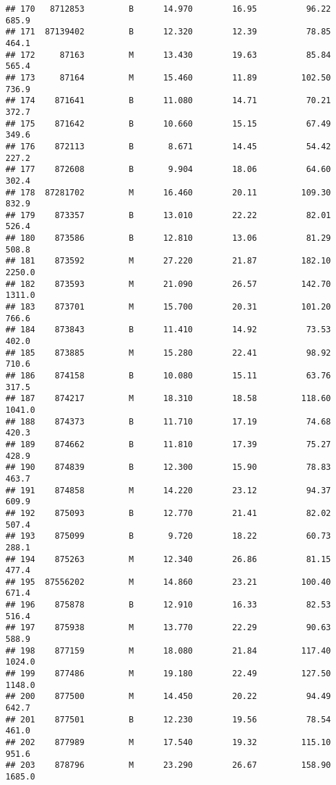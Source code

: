 \documentclass[
]{article}
\begin{document}
\begin{verbatim}
## 170   8712853         B      14.970        16.95          96.22     685.9
## 171  87139402         B      12.320        12.39          78.85     464.1
## 172     87163         M      13.430        19.63          85.84     565.4
## 173     87164         M      15.460        11.89         102.50     736.9
## 174    871641         B      11.080        14.71          70.21     372.7
## 175    871642         B      10.660        15.15          67.49     349.6
## 176    872113         B       8.671        14.45          54.42     227.2
## 177    872608         B       9.904        18.06          64.60     302.4
## 178  87281702         M      16.460        20.11         109.30     832.9
## 179    873357         B      13.010        22.22          82.01     526.4
## 180    873586         B      12.810        13.06          81.29     508.8
## 181    873592         M      27.220        21.87         182.10    2250.0
## 182    873593         M      21.090        26.57         142.70    1311.0
## 183    873701         M      15.700        20.31         101.20     766.6
## 184    873843         B      11.410        14.92          73.53     402.0
## 185    873885         M      15.280        22.41          98.92     710.6
## 186    874158         B      10.080        15.11          63.76     317.5
## 187    874217         M      18.310        18.58         118.60    1041.0
## 188    874373         B      11.710        17.19          74.68     420.3
## 189    874662         B      11.810        17.39          75.27     428.9
## 190    874839         B      12.300        15.90          78.83     463.7
## 191    874858         M      14.220        23.12          94.37     609.9
## 192    875093         B      12.770        21.41          82.02     507.4
## 193    875099         B       9.720        18.22          60.73     288.1
## 194    875263         M      12.340        26.86          81.15     477.4
## 195  87556202         M      14.860        23.21         100.40     671.4
## 196    875878         B      12.910        16.33          82.53     516.4
## 197    875938         M      13.770        22.29          90.63     588.9
## 198    877159         M      18.080        21.84         117.40    1024.0
## 199    877486         M      19.180        22.49         127.50    1148.0
## 200    877500         M      14.450        20.22          94.49     642.7
## 201    877501         B      12.230        19.56          78.54     461.0
## 202    877989         M      17.540        19.32         115.10     951.6
## 203    878796         M      23.290        26.67         158.90    1685.0

\end{verbatim}
\end{document}
